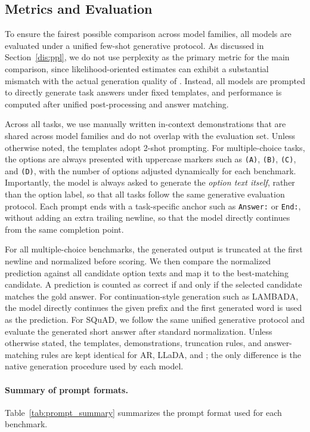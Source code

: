 \subsection{Metrics and Evaluation}
\label{app:metrics}

To ensure the fairest possible comparison across model families, all models are evaluated under a unified few-shot generative protocol. As discussed in Section~\ref{dis:ppl}, we do not use perplexity as the primary metric for the main comparison, since likelihood-oriented estimates can exhibit a substantial mismatch with the actual generation quality of \method. Instead, all models are prompted to directly generate task answers under fixed templates, and performance is computed after unified post-processing and answer matching.

Across all tasks, we use manually written in-context demonstrations that are shared across model families and do not overlap with the evaluation set. Unless otherwise noted, the templates adopt 2-shot prompting. For multiple-choice tasks, the options are always presented with uppercase markers such as \texttt{(A)}, \texttt{(B)}, \texttt{(C)}, and \texttt{(D)}, with the number of options adjusted dynamically for each benchmark. Importantly, the model is always asked to generate the \emph{option text itself}, rather than the option label, so that all tasks follow the same generative evaluation protocol. Each prompt ends with a task-specific anchor such as \texttt{Answer:} or \texttt{End:}, without adding an extra trailing newline, so that the model directly continues from the same completion point.

For all multiple-choice benchmarks, the generated output is truncated at the first newline and normalized before scoring. We then compare the normalized prediction against all candidate option texts and map it to the best-matching candidate. A prediction is counted as correct if and only if the selected candidate matches the gold answer. For continuation-style generation such as LAMBADA, the model directly continues the given prefix and the first generated word is used as the prediction. For SQuAD, we follow the same unified generative protocol and evaluate the generated short answer after standard normalization. Unless otherwise stated, the templates, demonstrations, truncation rules, and answer-matching rules are kept identical for AR, LLaDA, and \method; the only difference is the native generation procedure used by each model.

\paragraph{Summary of prompt formats.}
Table~\ref{tab:prompt_summary} summarizes the prompt format used for each benchmark.

